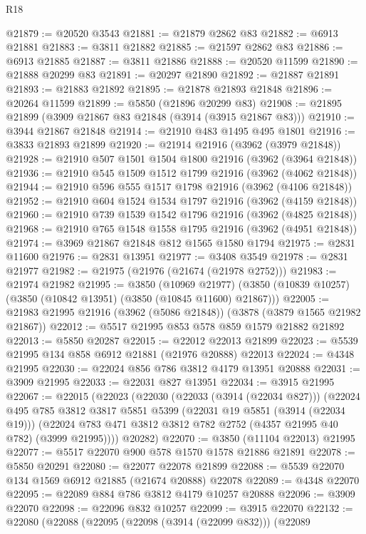 \begin{lexlean}{R18}
\begin{coremodule}
@21879 := @20520 @3543
@21881 := @21879 @2862 @83
@21882 := @6913 @21881
@21883 := @3811 @21882
@21885 := @21597 @2862 @83
@21886 := @6913 @21885
@21887 := @3811 @21886
@21888 := @20520 @11599
@21890 := @21888 @20299 @83
@21891 := @20297 @21890
@21892 := @21887 @21891
@21893 := @21883 @21892
@21895 := @21878 @21893 @21848
@21896 := @20264 @11599
@21899 := @5850 (@21896 @20299 @83)
@21908 := @21895 @21899 (@3909 @21867 @83 @21848 (@3914 (@3915 @21867 @83)))
@21910 := @3944 @21867 @21848
@21914 := @21910 @483 @1495 @495 @1801
@21916 := @3833 @21893 @21899
@21920 := @21914 @21916 (@3962 (@3979 @21848))
@21928 := @21910 @507 @1501 @1504 @1800 @21916 (@3962 (@3964 @21848))
@21936 := @21910 @545 @1509 @1512 @1799 @21916 (@3962 (@4062 @21848))
@21944 := @21910 @596 @555 @1517 @1798 @21916 (@3962 (@4106 @21848))
@21952 := @21910 @604 @1524 @1534 @1797 @21916 (@3962 (@4159 @21848))
@21960 := @21910 @739 @1539 @1542 @1796 @21916 (@3962 (@4825 @21848))
@21968 := @21910 @765 @1548 @1558 @1795 @21916 (@3962 (@4951 @21848))
@21974 := @3969 @21867 @21848 @812 @1565 @1580 @1794
@21975 := @2831 @11600
@21976 := @2831 @13951
@21977 := @3408 @3549
@21978 := @2831 @21977
@21982 := @21975 (@21976 (@21674 (@21978 @2752)))
@21983 := @21974 @21982
@21995 := @3850
    (@10969 @21977)
    (@3850 (@10839 @10257) (@3850 (@10842 @13951) (@3850 (@10845 @11600) @21867)))
@22005 := @21983 @21995 @21916 (@3962 (@5086 @21848)) (@3878 (@3879 @1565 @21982 @21867))
@22012 := @5517 @21995 @853 @578 @859 @1579 @21882 @21892
@22013 := @5850 @20287
@22015 := @22012 @22013 @21899
@22023 := @5539 @21995 @134 @858 @6912 @21881 (@21976 @20888) @22013
@22024 := @4348 @21995
@22030 := @22024 @856 @786 @3812 @4179 @13951 @20888
@22031 := @3909 @21995
@22033 := @22031 @827 @13951
@22034 := @3915 @21995
@22067 := @22015
    (@22023
      (@22030
        (@22033 (@3914 (@22034 @827)))
        (@22024
          @495
          @785
          @3812
          @3817
          @5851
          @5399
          (@22031 @19 @5851 (@3914 (@22034 @19)))
          (@22024 @783 @471 @3812 @3812 @782 @2752 (@4357 @21995 @40 @782) (@3999 @21995))))
      @20282)
@22070 := @3850 (@11104 @22013) @21995
@22077 := @5517 @22070 @900 @578 @1570 @1578 @21886 @21891
@22078 := @5850 @20291
@22080 := @22077 @22078 @21899
@22088 := @5539 @22070 @134 @1569 @6912 @21885 (@21674 @20888) @22078
@22089 := @4348 @22070
@22095 := @22089 @884 @786 @3812 @4179 @10257 @20888
@22096 := @3909 @22070
@22098 := @22096 @832 @10257
@22099 := @3915 @22070
@22132 := @22080
    (@22088
      (@22095
        (@22098 (@3914 (@22099 @832)))
        (@22089

\end{coremodule}
\end{lexlean}
